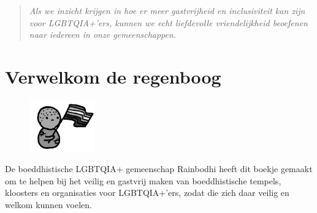 \documentclass[12pt,openany]{book}
\begin{document}
\begin{figure}[h]
    \centering
\end{figure}

\begin{quote}
\centering
\textit{\Large Als we inzicht krijgen in hoe er meer gastvrijheid en inclusiviteit kan zijn voor LGBTQIA+’ers, kunnen we echt liefdevolle vriendelijkheid beoefenen naar iedereen in onze gemeenschappen.}
\end{quote}

\setlength{\parindent}{15pt}
\chapter*{Verwelkom de regenboog}

\begin{figure}
    \centering
    \includegraphics[width=0.25\textwidth]{2bw3.png}
\end{figure}
De boeddhistische LGBTQIA+ gemeenschap Rainbodhi heeft dit boekje gemaakt om  te helpen bij het veilig en gastvrij maken van boeddhistische tempels, kloosters en organisaties voor LGBTQIA+’ers, zodat die zich daar veilig en welkom kunnen voelen.
\end{document}
